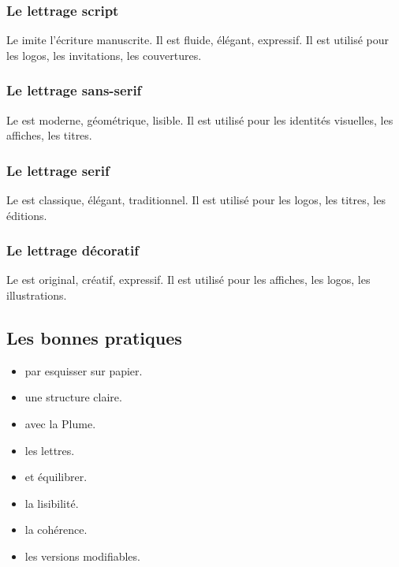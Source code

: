 \subsubsection{Le lettrage script}

Le  imite l'écriture manuscrite. Il est fluide, élégant, expressif. Il est utilisé pour les logos, les invitations, les couvertures.

\subsubsection{Le lettrage sans-serif}

Le  est moderne, géométrique, lisible. Il est utilisé pour les identités visuelles, les affiches, les titres.

\subsubsection{Le lettrage serif}

Le  est classique, élégant, traditionnel. Il est utilisé pour les logos, les titres, les éditions.

\subsubsection{Le lettrage décoratif}

Le  est original, créatif, expressif. Il est utilisé pour les affiches, les logos, les illustrations.

\subsection{Les bonnes pratiques}

\begin{itemize}
    \item {} par esquisser sur papier.
    \item {} une structure claire.
    \item {} avec la Plume.
    \item {} les lettres.
    \item {} et équilibrer.
    \item {} la lisibilité.
    \item {} la cohérence.
    \item {} les versions modifiables.
\end{itemize}

